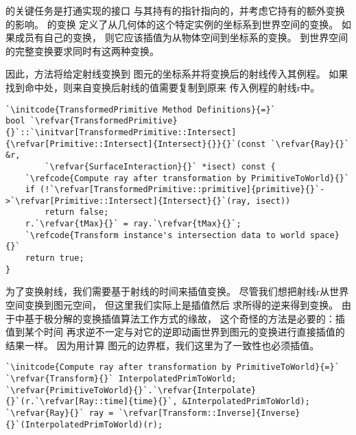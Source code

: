 的关键任务是打通实现的接口
与其持有的指针指向的，并考虑它持有的额外变换的影响。\linebreak
{}的变换
定义了从几何体的这个特定实例的坐标系到世界空间的变换。
如果成员有自己的变换，
则它应该插值为从物体空间到坐标系的变换。
到世界空间的完整变换要求同时有这两种变换。

因此，方法将给定射线变换到
图元的坐标系并将变换后的射线传入其例程。
如果找到命中处，则来自变换后射线的值需要复制到原来
传入例程的射线{\ttfamily r}中。
\begin{lstlisting}
`\initcode{TransformedPrimitive Method Definitions}{=}`
bool `\refvar{TransformedPrimitive}{}`::`\initvar[TransformedPrimitive::Intersect]{\refvar[Primitive::Intersect]{Intersect}{}}{}`(const `\refvar{Ray}{}` &r, 
        `\refvar{SurfaceInteraction}{}` *isect) const {
    `\refcode{Compute ray after transformation by PrimitiveToWorld}{}`
    if (!`\refvar[TransformedPrimitive::primitive]{primitive}{}`->`\refvar[Primitive::Intersect]{Intersect}{}`(ray, isect))
        return false;
    r.`\refvar{tMax}{}` = ray.`\refvar{tMax}{}`;
    `\refcode{Transform instance's intersection data to world space}{}`
    return true;
}
\end{lstlisting}

为了变换射线，我们需要基于射线的时间来插值变换。
尽管我们想把射线{\ttfamily r}从世界空间变换到图元空间，
但这里我们实际上是插值然后
求所得的逆来得到变换。
由于中基于极分解的变换插值算法工作方式的缘故，
这个奇怪的方法是必要的：插值到某个时间
再求逆不一定与对它的逆即动画世界到图元的变换进行直接插值的结果一样。
因为用计算
图元的边界框，我们这里为了一致性也必须插值。
\begin{lstlisting}
`\initcode{Compute ray after transformation by PrimitiveToWorld}{=}`
`\refvar{Transform}{}` InterpolatedPrimToWorld;
`\refvar{PrimitiveToWorld}{}`.`\refvar{Interpolate}{}`(r.`\refvar[Ray::time]{time}{}`, &InterpolatedPrimToWorld);
`\refvar{Ray}{}` ray = `\refvar[Transform::Inverse]{Inverse}{}`(InterpolatedPrimToWorld)(r);
\end{lstlisting}


